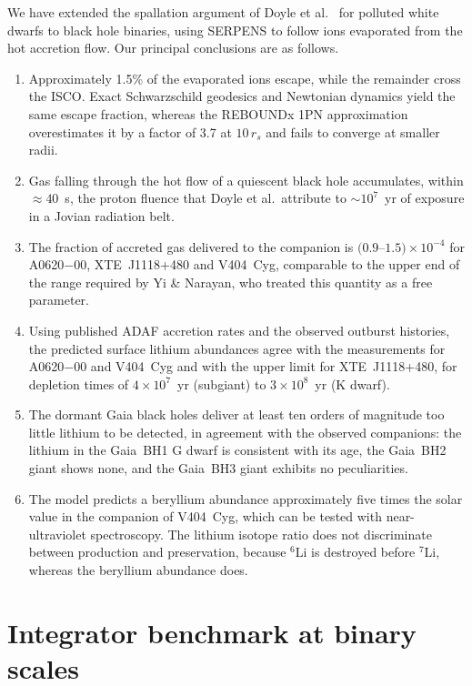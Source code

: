 \documentclass[twocolumn,showpacs,preprintnumbers,amsmath,amssymb]{revtex4}
\begin{document}
We have extended the spallation argument of Doyle et al.\ \cite{Doyle_2021} for polluted white dwarfs to black hole binaries, using SERPENS to follow ions evaporated from the hot accretion flow. Our principal conclusions are as follows.
\begin{enumerate}
\item Approximately 1.5\% of the evaporated ions escape, while the remainder cross the ISCO. Exact Schwarzschild geodesics and Newtonian dynamics yield the same escape fraction, whereas the REBOUNDx 1PN approximation overestimates it by a factor of 3.7 at $10\,r_s$ and fails to converge at smaller radii.
\item Gas falling through the hot flow of a quiescent black hole accumulates, within $\approx40$~s, the proton fluence that Doyle et al.\ attribute to $\sim10^{7}$~yr of exposure in a Jovian radiation belt.
\item The fraction of accreted gas delivered to the companion is $(0.9$--$1.5)\times10^{-4}$ for A0620$-$00, XTE~J1118+480 and V404~Cyg, comparable to the upper end of the range required by Yi \& Narayan, who treated this quantity as a free parameter.
\item Using published ADAF accretion rates and the observed outburst histories, the predicted surface lithium abundances agree with the measurements for A0620$-$00 and V404~Cyg and with the upper limit for XTE~J1118+480, for depletion times of $4\times10^{7}$~yr (subgiant) to $3\times10^{8}$~yr (K dwarf).
\item The dormant Gaia black holes deliver at least ten orders of magnitude too little lithium to be detected, in agreement with the observed companions: the lithium in the Gaia~BH1 G dwarf is consistent with its age, the Gaia~BH2 giant shows none, and the Gaia~BH3 giant exhibits no peculiarities.
\item The model predicts a beryllium abundance approximately five times the solar value in the companion of V404~Cyg, which can be tested with near-ultraviolet spectroscopy. The lithium isotope ratio does not discriminate between production and preservation, because $^6$Li is destroyed before $^7$Li, whereas the beryllium abundance does.
\end{enumerate}


\FloatBarrier


\appendix

\section{\label{app:benchmark} Integrator benchmark at binary scales}
\end{document}
